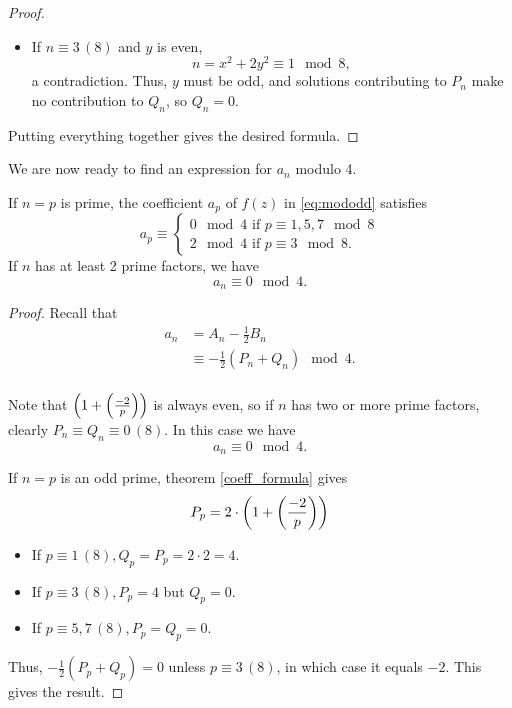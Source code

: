 \documentclass[12pt, a4paper]{report}
\begin{document}
\begin{proof}
\begin{itemize}
  \item If $n \equiv 3 \, (8)$ and $y$ is even,
    \[n = x^2 + 2y^2 \equiv 1 \mod{8},\] a contradiction. Thus, $y$ must be odd,
    and solutions contributing to $P_n$ make no contribution to $Q_n$, so $Q_n =
    0$.
  \end{itemize}
  Putting everything together gives the desired formula.

\end{proof}

\newpage

We are now ready to find an expression for $a_n$ modulo 4. 

\begin{thm} \label{theta_calculation}
  If $n = p$ is prime, the coefficient $a_p$ of $f(z)$ in \autoref{eq:mododd}
  satisfies
  \[a_p \equiv \begin{cases}
      0 \mod{4} \text{ if } p \equiv 1,5,7 \mod{8} \\
      2 \mod{4} \text{ if } p \equiv 3 \mod{8}.
    \end{cases}\]
  If $n$ has at least 2 prime factors, we have
  \[a_n \equiv 0 \mod{4}.\]
\end{thm}
\begin{proof}
  Recall that
  \[
    \begin{split}
      a_n &= A_n - \frac{1}{2}B_n \\
      &\equiv -\frac{1}{2}(P_n + Q_n) \mod{4}. \\
    \end{split}
  \]

  Note that $\left( 1 + \left(\frac{-2}{p}\right) \right)$ is always even, so
  if $n$ has two or more prime factors, clearly $P_n \equiv Q_n \equiv 0 \,(8)$.
  In this case we have
  \[a_n\equiv 0 \mod{4}.\]

  If $n = p$ is an odd prime, theorem \autoref{coeff_formula} gives
  \[P_p = 2 \cdot \left( 1 + \left(\frac{-2}{p}\right) \right)\]
  \begin{itemize}
  \item If $p \equiv 1 \, (8), Q_p = P_p = 2 \cdot 2 = 4$.

  \item If $p \equiv 3 \, (8), P_p = 4$ but $Q_p = 0$.

  \item If $p \equiv 5, 7 \, (8), P_p = Q_p = 0$.
  \end{itemize}
  Thus, $-\frac{1}{2} (P_p + Q_p) = 0$ unless $p \equiv 3 \, (8)$, in which case
  it equals $-2$. This gives the result.

\end{proof}
\end{document}
